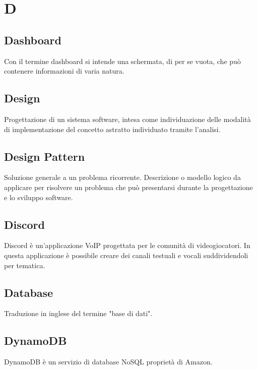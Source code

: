 \section{D}
	\subsection{Dashboard}  
		Con il termine dashboard si intende una schermata, di per se vuota, che può contenere informazioni di varia natura.
	\subsection{Design}  
		Progettazione di un sistema software, intesa come individuazione delle modalità di implementazione del concetto astratto individuato tramite l'analisi.
	\subsection{Design Pattern}
		Soluzione generale a un problema ricorrente. Descrizione o modello logico da applicare per risolvere un problema che può presentarsi durante la progettazione e lo sviluppo software.
	\subsection{Discord}  
		Discord è un'applicazione VoIP progettata per le comunità di videogiocatori. In questa applicazione è possibile creare dei canali testuali e vocali suddividendoli per tematica. 
    \subsection{Database}
        Traduzione in inglese del termine "base di dati".
    \subsection{DynamoDB}
        DynamoDB è un servizio di database NoSQL proprietà di Amazon.
\newpage